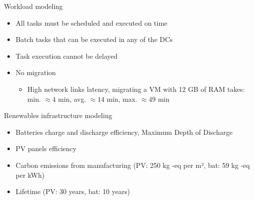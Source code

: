 \documentclass[Ligatures=TeX,table,svgnames,usetotalslideindicator,compress,10pt,aspectratio=169]{beamer}
\begin{document}
\begin{frame}{Workload modeling}  
  \textbf{}
  
  \begin{itemize}  
  \item All tasks must be scheduled and executed on time
  \item Batch tasks that can be executed in any of the DCs 
  \item Task execution cannot be delayed
  \item No migration %
    \begin{itemize}  
    \item High network links latency, migrating a VM with 12 GB of RAM takes: min. $\approx 4$ min, avg. $\approx 14$ min, max. $\approx 49$ min
  \end{itemize}
  \end{itemize}

\end{frame}

\begin{frame}{Renewables infrastructure modeling}
  
  
  
  \begin{itemize}    
  \item Batteries charge and discharge efficiency, Maximum Depth of Discharge
  \item PV panels efficiency    
  \item Carbon emissions from manufacturing (PV: 250 kg -eq per m², bat: 59 kg -eq per kWh)
  \item Lifetime (PV: 30 years, bat: 10 years)      
  \end{itemize}
  
\end{frame}
\addtocounter{framenumber}{-1}
\end{document}
